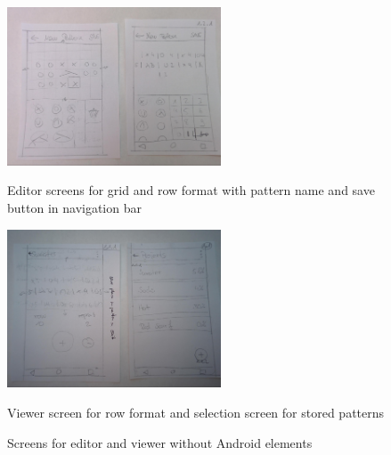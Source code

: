 \begin{figure}
\centering
\begin{minipage}{.5\textwidth}
  \centering
  \includegraphics[width=2.5in]{images/image09.jpg}
  \caption{Editor screens for grid and row format with pattern name and save button in navigation bar}
  \label{fig_wireframe1}
\end{minipage}

\begin{minipage}{.5\textwidth}
  \centering
  \includegraphics[width=2.5in]{images/image08.jpg}
  \caption{Viewer screen for row format and selection screen for stored patterns}
  \label{fig_wireframe2}
\end{minipage}
\caption{Screens for editor and viewer without Android elements}
\end{figure}


